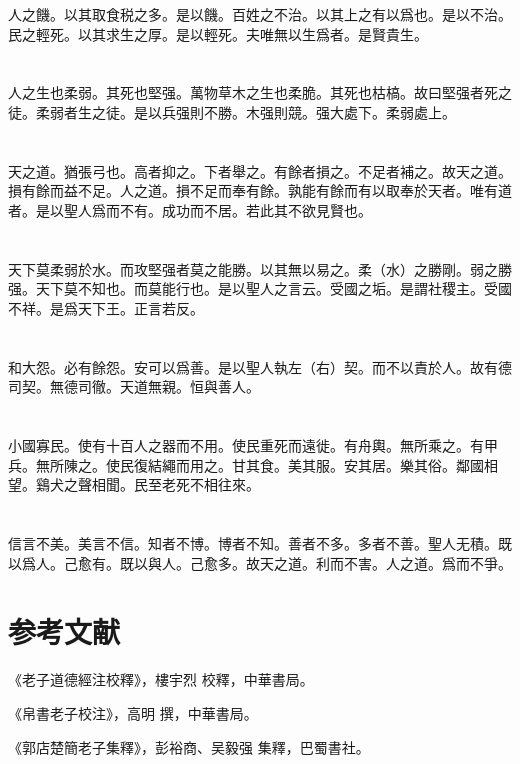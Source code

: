 \documentclass[a5paper]{ctexbook}
\begin{document}
    人之饑。以其取食税之多。是以饑。百姓之不治。以其上之有以爲也。是以不治。民之輕死。以其求生之厚。是以輕死。夫唯無以生爲者。是賢貴生。

    \chapter{}

    人之生也柔弱。其死也堅强。萬物草木之生也柔脆。其死也枯槁。故曰堅强者死之徒。柔弱者生之徒。是以兵强則不勝。木强則競。强大處下。柔弱處上。

    \chapter{}

    天之道。猶張弓也。高者抑之。下者舉之。有餘者損之。不足者補之。故天之道。損有餘而益不足。人之道。損不足而奉有餘。孰能有餘而有以取奉於天者。唯有道者。是以聖人爲而不有。成功而不居。若此其不欲見賢也。

    \chapter{}

    天下莫柔弱於水。而攻堅强者莫之能勝。以其無以易之。柔（水）之勝剛。弱之勝强。天下莫不知也。而莫能行也。是以聖人之言云。受國之垢。是謂社稷主。受國不祥。是爲天下王。正言若反。

    \chapter{}

    和大怨。必有餘怨。安可以爲善。是以聖人執左（右）契。而不以責於人。故有德司契。無德司徹。天道無親。恒與善人。

    \chapter{}

    小國寡民。使有十百人之器而不用。使民重死而遠徙。有舟輿。無所乘之。有甲兵。無所陳之。使民復結繩而用之。甘其食。美其服。安其居。樂其俗。鄰國相望。鷄犬之聲相聞。民至老死不相往來。

    \chapter{}

    信言不美。美言不信。知者不博。博者不知。善者不多。多者不善。聖人无積。既以爲人。己愈有。既以與人。己愈多。故天之道。利而不害。人之道。爲而不爭。

    \chapter*{参考文献}

    《老子道德經注校釋》，樓宇烈 校釋，中華書局。

    《帛書老子校注》，高明 撰，中華書局。

    《郭店楚簡老子集釋》，彭裕商、吴毅强 集釋，巴蜀書社。
\end{document}
